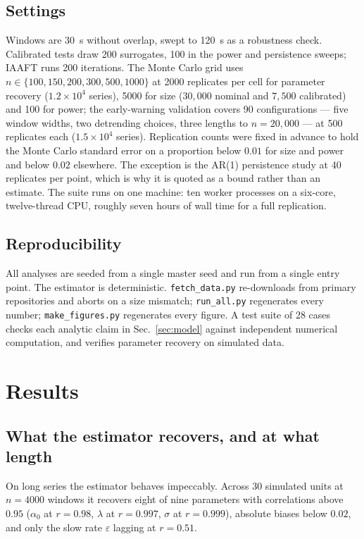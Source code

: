 \documentclass[conference]{IEEEtran}
\begin{document}
\subsection{Settings}
Windows are \SI{30}{\second} without overlap, swept to \SI{120}{\second} as a
robustness check. Calibrated tests draw 200 surrogates, 100 in the power and
persistence sweeps; IAAFT runs 200 iterations. The Monte Carlo grid uses
$n\in\{100,150,200,300,500,1000\}$ at 2000 replicates per cell for parameter
recovery ($1.2\times10^{4}$ series), 5000 for size ($30{,}000$ nominal and
$7{,}500$ calibrated) and 100 for power; the early-warning validation covers 90
configurations --- five window widths, two detrending choices, three lengths to
$n=20{,}000$ --- at 500 replicates each ($1.5\times10^{4}$ series). Replication
counts were fixed in advance to hold the Monte Carlo standard error on a
proportion below $0.01$ for size and power and below $0.02$ elsewhere. The
exception is the AR(1) persistence study at 40 replicates per point, which is
why it is quoted as a bound rather than an estimate. The suite runs on one
machine: ten worker processes on a six-core, twelve-thread CPU, roughly seven
hours of wall time for a full replication.

\subsection{Reproducibility}
All analyses are seeded from a single master seed and run from a single entry
point. The estimator is
deterministic. \texttt{fetch\_data.py} re-downloads from primary repositories
and aborts on a size mismatch; \texttt{run\_all.py} regenerates every number;
\texttt{make\_figures.py} regenerates every figure. A test suite of 28 cases
checks each analytic claim in Sec.~\ref{sec:model} against independent
numerical computation, and verifies parameter recovery on simulated data.

\section{Results}
\label{sec:results}

\subsection{What the estimator recovers, and at what length}
\label{sec:recovery}
On long series the estimator behaves impeccably. Across 30 simulated units at
$n=4000$ windows it recovers eight of nine parameters with correlations above
$0.95$ ($\alpha_0$ at $r=0.98$, $\lambda$ at $r=0.997$, $\sigma$ at $r=0.999$),
absolute biases below $0.02$, and only the slow rate $\varepsilon$ lagging at
$r=0.51$.
\end{document}
